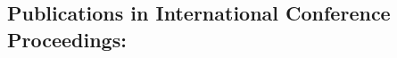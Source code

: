 \vspace{1ex}
\subsection*{Publications in International Conference Proceedings:}
\vspace{1ex}
%
%
%
%
